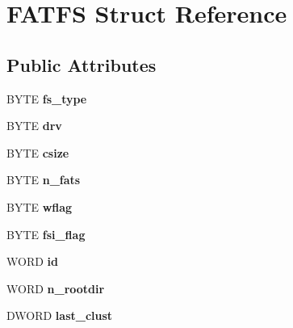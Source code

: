\hypertarget{struct_f_a_t_f_s}{}\section{F\+A\+T\+FS Struct Reference}
\label{struct_f_a_t_f_s}
\subsection*{Public Attributes}
\begin{DoxyCompactItemize}
\item 
\mbox{\label{struct_f_a_t_f_s_add27d97babe807b573eac98a71dc4ae5}} 
B\+Y\+TE {\bfseries fs\+\_\+type}
\item 
\mbox{\label{struct_f_a_t_f_s_a6a791560e2687e8b1569bfce61208d2d}} 
B\+Y\+TE {\bfseries drv}
\item 
\mbox{\label{struct_f_a_t_f_s_a504a1175f6dcc9a854b9da94463bd108}} 
B\+Y\+TE {\bfseries csize}
\item 
\mbox{\label{struct_f_a_t_f_s_a56716c7e7ac10cf46e73ffb2a2e9b545}} 
B\+Y\+TE {\bfseries n\+\_\+fats}
\item 
\mbox{\label{struct_f_a_t_f_s_a647e43c9ccae94b7274793d1909897de}} 
B\+Y\+TE {\bfseries wflag}
\item 
\mbox{\label{struct_f_a_t_f_s_a84e9cdc5a6a8e33ea7ec192058abf161}} 
B\+Y\+TE {\bfseries fsi\+\_\+flag}
\item 
\mbox{\label{struct_f_a_t_f_s_a417095d7c20d56d417dc0998e0dd5a5c}} 
W\+O\+RD {\bfseries id}
\item 
\mbox{\label{struct_f_a_t_f_s_a189a00aa038044ffad0fc7f7dcf2aae1}} 
W\+O\+RD {\bfseries n\+\_\+rootdir}
\item 
\mbox{\label{struct_f_a_t_f_s_ad315def289218e26ab78ff90fde700d1}} 
D\+W\+O\+RD {\bfseries last\+\_\+clust}
\item 
\mbox{\label{struct_f_a_t_f_s_a5fb49e6ac511bd97eaffdd636d0e4165}} 

\end{DoxyCompactItemize}
